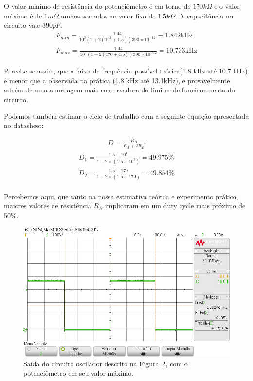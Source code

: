 \documentclass[12pt,a4paper]{article}
\begin{document}
O valor minímo de resistência do potenciômetro é em torno de $170 k\Omega$ e o valor máximo é de $1 m\Omega$ ambos somados ao valor fixo de  $ 1.5k\Omega$. A capacitância no circuito vale $390pF$.
\begin{align*}
  F_{min} = \frac{1.44}{10^3 \left(1+ 2 \left(   10^3 +1.5 \right)\right)390\times 10^{-12}}=1.842 \text{kHz}  \\ 
  F_{max} = \frac{1.44}{10^3 \left(1+ 2 \left(   170 +1.5  \right)\right)390\times 10^{-12}}=10.733 \text{kHz}
\end{align*}

Percebe-se assim, que a faixa de frequência possível teórica(1.8 kHz até 10.7 kHz) é menor que a observada na prática (1.8 kHz até 13.1kHz), e provavelmente advém de uma  abordagem mais conservadora do limites de funcionamento do circuito.

Podemos também estimar o ciclo de trabalho com a seguinte equação apresentada no datasheet:

\begin{align}
  D= \frac{R_B}{R_A + 2R_B} 
\end{align}
\begin{align*}
  D_{1}= \frac{1.5 + 10^3}{1+2\times(1.5+10^3)}= 49.975\% \\
  D_{2}= \frac{1.5 + 170}{1+2\times(1.5+170)}= 49.854\% \\
\end{align*}

Percebemos aqui, que tanto na nossa estimativa teórica e experimento prático, maiores valores de 
resistência $R_B$ implicaram em um duty cycle mais próximo de 50\%.
\begin{figure}[htpb]
  \centering
  \includegraphics[width=0.8\linewidth]{img/min.jpg}
  \caption{Saída do circuito oscilador descrito na Figura~2, com o potenciômetro em seu valor máximo. }
  \label{fig:3}
\end{figure}
\end{document}

